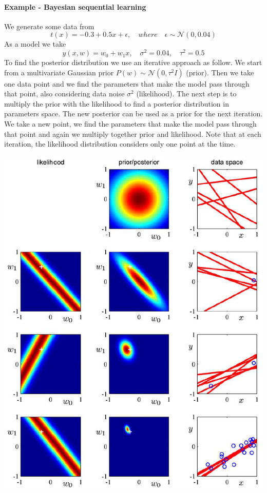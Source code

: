\documentclass[../main.tex]{subfiles}
\begin{document}
\newpage
\paragraph{Example - Bayesian sequential learning}
We generate some data from
\begin{equation*}
    t(x) = -0.3 + 0.5x + \epsilon, \quad where \quad \epsilon \sim \mathcal{N}(0,0.04)
\end{equation*}
As a model we take
\begin{equation*}
    y(x,w) = w_0+w_1x, \quad \sigma^2=0.04, \quad \tau^2=0.5
\end{equation*}
To find the posterior distribution we use an iterative approach as follow.
We start from a multivariate Gaussian prior $P(w) \sim \mathcal{N}(0,\tau^2 I)$ (prior). Then we take one data point and we find the parameters that make the model pass through that point, also considering data noise $\sigma^2$ (likelihood). The next step is to multiply the prior with the likelihood to find a posterior distribution in parameters space. The new posterior can be used as a prior for the next iteration. We take a new point, we find the parameters that make the model pass through that point and again we multiply together prior and likelihood. Note that at each iteration, the likelihood distribution considers only one point at the time.
\begin{center}
    \includegraphics[scale=0.6]{images/Bayes_sequential.PNG}
\end{center}
\end{document}
